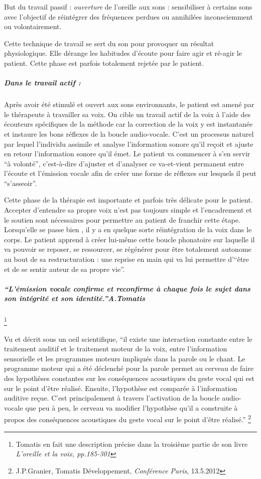 But du travail passif : \emph{ouverture} de l'oreille
aux sons : sensibiliser à certains sons avec l'objectif de réintégrer
des fréquences perdues ou annihilées inconsciemment ou volontairement. 

Cette technique de travail se sert du son pour provoquer un résultat
physiologique. Elle dérange les habitudes d'écoute pour faire agir
et ré-agir le patient. Cette phase est parfois totalement rejetée
par le patient.

\subparagraph{Dans le travail actif :}

Après avoir été stimulé et ouvert aux sons environnants, le patient
est amené par le thérapeute à travailler sa voix. On cible un travail
actif de la voix à l'aide des écouteurs spécifiques de la méthode
car la correction de la voix y est instantanée et instaure les bons
réflexes de la boucle audio-vocale. C'est un processus naturel par
lequel l'individu assimile et analyse l'information sonore qu'il reçoit
et ajuste en retour l'information sonore qu'il émet. Le patient va
commencer à s'en servir ``à volonté'', c'est-à-dire d'ajuster et
d'analyser ce va-et-vient permanent entre l'écoute et l'émission vocale
afin de créer une forme de réflexes sur lesquels il peut ``s'asseoir''. 

Cette phase de la thérapie est importante et parfois très délicate
pour le patient. Accepter d'entendre sa propre voix n'est pas toujours
simple et l'encadrement et le soutien sont nécessaires pour permettre
au patient de franchir cette étape. Lorsqu'elle se passe bien , il
y a en quelque sorte réintégration de la voix dans le corps. Le patient
apprend à créer lui-même cette boucle phonatoire sur laquelle il va
pouvoir se reposer, se ressourcer, se régénérer pour être totalement
autonome au bout de sa restructuration : une reprise en main qui va
lui permettre d'``être et de se sentir auteur de sa propre vie''. 

\subparagraph{\textmd{\emph{``L'émission vocale confirme et reconfirme à chaque
fois le sujet dans son intégrité et son identité.''A.Tomatis}}}

\footnote{Tomatis en fait une description précise dans la troisième partie de
son livre\emph{ L'oreille et la voix, pp.185-301}}

Vu et décrit sous un oeil scientifique, ``il existe une interaction
constante entre le traitement auditif et le traitement moteur de la
voix, entre l'information sensorielle et les programmes moteurs impliqués
dans la parole ou le chant. Le programme moteur qui a été déclenché
pour la parole permet au cerveau de faire des hypothèses constantes
sur les conséquences acoustiques du geste vocal qui est sur le point
d'être réalisé. Ensuite, l'hypothèse est comparée à l'information
auditive reçue. C'est principalement à travers l'activation de la
boucle audio-vocale que peu à peu, le cerveau va modifier l'hypothèse
qu'il a construite à propos des conséquences acoustiques du geste
vocal sur le point d'être réalisé.'' \footnote{J.P.Granier, Tomatis Développement,\emph{ Conférence Paris}, 13.5.2012}
